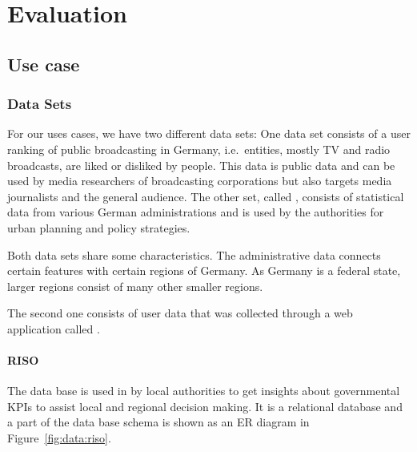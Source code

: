 \chapter{Evaluation}\label{sec:evaluation}

\section{Use case}\label{sec:use-case}

\subsection{Data Sets}
For our uses cases, we have two different data sets:
One data set consists of a user ranking of public broadcasting in Germany, i.e.\ entities, mostly TV and radio broadcasts, are liked or disliked by people.
This data is public data and can be used by media researchers of broadcasting corporations but also targets media journalists and the general audience.
The other set, called \riso{}, consists of statistical data from various German administrations and is used by the authorities for urban planning and policy strategies.

Both data sets share some characteristics.
The administrative data connects certain features with certain regions of Germany.
As Germany is a federal state, larger regions consist of many other smaller regions.

The second one consists of user data that was collected through a web application called \rufu{}.

\subsubsection{RISO}

The \riso{} data base is used in by local authorities to get insights about governmental KPIs to assist local and regional decision making.
It is a relational database and a part of the data base schema is shown as an ER diagram in Figure~\ref{fig:data:riso}.

